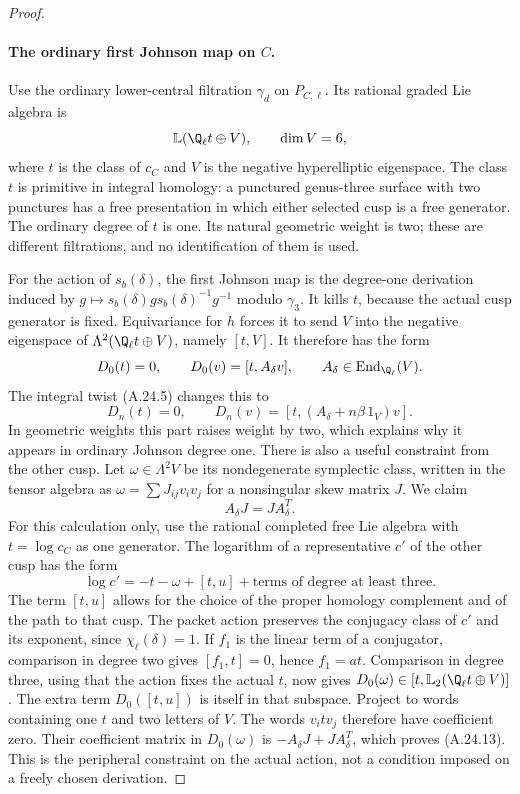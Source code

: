 \begin{proof}
\paragraph{The ordinary first Johnson map on $C$.}
Use the ordinary lower-central filtration $\gamma_d$ on
$P_{C,\ell}$. Its rational graded Lie algebra is
\[
                  \mathbb L(\Q_\ell t\oplus V),\qquad
                         \dim V=6,
\]
where $t$ is the class of $c_C$ and $V$ is the negative
hyperelliptic eigenspace. The class $t$ is primitive in
integral homology: a punctured genus-three surface with
two punctures has a free presentation in which either
selected cusp is a free generator.
The ordinary degree of $t$ is one. Its natural geometric
weight is two; these are different filtrations, and no
identification of them is used.

For the action of $s_b(\delta)$, the first Johnson map is
the degree-one derivation induced by
$g\mapsto s_b(\delta)g s_b(\delta)^{-1}g^{-1}$
modulo $\gamma_3$. It kills $t$, because the actual cusp
generator is fixed. Equivariance for $h$ forces it to send
$V$ into the negative eigenspace of
$\Lambda^2(\Q_\ell t\oplus V)$, namely $[t,V]$.
It therefore has the form
\[
             D_0(t)=0,\qquad D_0(v)=[t,A_\delta v],
                \qquad A_\delta\in\operatorname{End}_{\Q_\ell}(V).
\]
The integral twist (A.24.5) changes this to
\[
       D_n(t)=0,\qquad
       D_n(v)=[t,(A_\delta+n\beta\,1_V)v].               \tag{A.24.8}
\]
In geometric weights this part raises weight by two, which
explains why it appears in ordinary Johnson degree one.
There is also a useful constraint from the other cusp.
Let $\omega\in\Lambda^2V$ be its nondegenerate symplectic
class, written in the tensor algebra as
$\omega=\sum J_{ij}v_iv_j$ for a nonsingular skew matrix
$J$. We claim
\[
                         A_\delta J=J A_\delta^T.
                                                        \tag{A.24.13}
\]
For this calculation only, use the rational completed
free Lie algebra with $t=\log c_C$ as one generator.
The logarithm of a representative $c'$ of the other
cusp has the form
\[
               \log c'=-t-\omega+[t,u]
                         +\text{terms of degree at least three}.
\]
The term $[t,u]$ allows for the choice of the proper
homology complement and of the path to that cusp.
The packet action preserves the conjugacy class of
$c'$ and its exponent, since $\chi_\ell(\delta)=1$.
If $f_1$ is the linear term of a conjugator, comparison
in degree two gives $[f_1,t]=0$, hence $f_1=a t$.
Comparison in degree three, using that the action
fixes the actual $t$, now gives
$D_0(\omega)\in[t,\mathbb L_2(\Q_\ell t\oplus V)]$.
The extra term $D_0([t,u])$ is itself in that subspace.
Project to words containing one $t$ and two letters of
$V$. The words $v_i t v_j$ therefore have coefficient
zero. Their coefficient matrix in $D_0(\omega)$ is
$-A_\delta J+J A_\delta^T$, which proves (A.24.13).
This is the peripheral constraint on the actual action,
not a condition imposed on a freely chosen derivation.


\end{proof}
